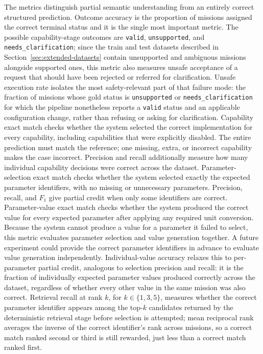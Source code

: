 The metrics distinguish partial semantic understanding from an entirely correct structured prediction.
Outcome accuracy is the proportion of missions assigned the correct terminal status and it is the single most important metric. The possible capability-stage outcomes are \texttt{valid}, \texttt{unsupported}, and \texttt{needs\_clarification}; since the train and test datasets described in Section~\ref{sec:extended-datasets} contain unsupported and ambiguous missions alongside supported ones, this metric also measures unsafe acceptance of a request that should have been rejected or referred for clarification. Unsafe execution rate isolates the most safety-relevant part of that failure mode: the fraction of missions whose gold status is \texttt{unsupported} or \texttt{needs\_clarification} for which the pipeline nonetheless reports a \texttt{valid} status and an applicable configuration change, rather than refusing or asking for clarification.
Capability exact match checks whether the system selected the correct implementation for every capability, including capabilities that were explicitly disabled. The entire prediction must match the reference; one missing, extra, or incorrect capability makes the case incorrect. Precision and recall additionally measure how many individual capability decisions were correct across the dataset.
Parameter-selection exact match checks whether the system selected exactly the expected parameter identifiers, with no missing or unnecessary parameters. Precision, recall, and $F_1$ give partial credit when only some identifiers are correct.
Parameter-value exact match checks whether the system produced the correct value for every expected parameter after applying any required unit conversion. Because the system cannot produce a value for a parameter it failed to select, this metric evaluates parameter selection and value generation together. A future experiment could provide the correct parameter identifiers in advance to evaluate value generation independently. Individual-value accuracy relaxes this to per-parameter partial credit, analogous to selection precision and recall: it is the fraction of individually expected parameter values produced correctly across the dataset, regardless of whether every other value in the same mission was also correct.
Retrieval recall at rank $k$, for $k \in \{1,3,5\}$, measures whether the correct parameter identifier appears among the top-$k$ candidates returned by the deterministic retrieval stage before selection is attempted; mean reciprocal rank averages the inverse of the correct identifier's rank across missions, so a correct match ranked second or third is still rewarded, just less than a correct match ranked first.
